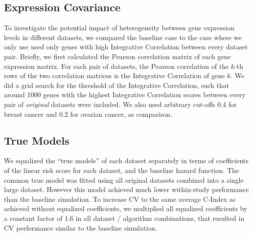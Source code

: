 \documentclass{bioinfo}
\begin{document}
  \subsection{Expression Covariance}
  To investigate the potential impact of heterogeneity between gene
  expression levels in different datasets, we compared the baseline
  case to the case where we only use used only genes with
  high Integrative Correlation \citep{Parmigiani2004, Garrett-Mayer2008}
  between every dataset pair. Briefly, we first calculated the Pearson
  correlation matrix of each gene expression matrix. For each pair of
  datasets, the Pearson correlation of the $k$-th rows of the two
  correlation matrices is the Integrative Correlation of gene $k$. 
  We did a grid search for the threshold of the Integrative Correlation,
  such that around 1000 genes with
  the highest Integrative Correlation scores between every pair
  of \emph{original} datasets were included. We also used arbitrary cut-offs 0.4 for 
  breast cancer and 0.2 for ovarian cancer, as comparison.

  \subsection{True Models}
  We equalized the ``true models'' of each dataset separately in terms
  of coefficients of the linear risk score for each dataset, and
  the baseline hazard function.  The common true model was fitted using
  all original datasets combined into a single large dataset.  However
  this model achieved much lower within-study performance than the
  baseline simulation. To increase CV to the same average C-Index as achieved without
  equalized coefficients, we multiplied all equalized coefficients
  by a constant factor of 1.6 in all dataset / algorithm combinations, that resulted 
  in CV performance similar
  to the baseline simulation.%


  
\end{document}
